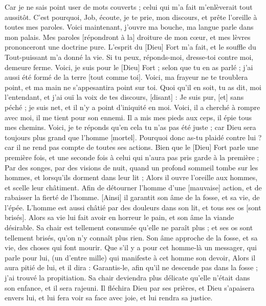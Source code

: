 \begin{multicols}{2}
Car je ne sais point user de mots couverts ; celui qui m'a fait m'enlèverait tout aussitôt.
\VerseOne{}C'est pourquoi, Job, écoute, je te prie, mon discours, et prête l'oreille à toutes mes paroles.
Voici maintenant, j'ouvre ma bouche, ma langue parle dans mon palais.
Mes paroles [répondront à la] droiture de mon cœur, et mes lèvres prononceront une doctrine pure.
L'esprit du [Dieu] Fort m'a fait, et le souffle du Tout-puissant m'a donné la vie.
Si tu peux, réponds-moi, dresse-toi contre moi, demeure ferme.
Voici, je suis pour le [Dieu] Fort ; selon que tu en as parlé ; j'ai aussi été formé de la terre [tout comme toi].
Voici, ma frayeur ne te troublera point, et ma main ne s'appesantira point sur toi.
Quoi qu'il en soit, tu as dit, moi l'entendant, et j'ai ouï la voix de tes discours, [disant] :
Je suis pur, [et] sans péché ; je suis net, et il n'y a point d'iniquité en moi.
Voici, il a cherché à rompre avec moi, il me tient pour son ennemi.
Il a mis mes pieds aux ceps, il épie tous mes chemins.
Voici, je te réponds qu'en cela tu n'as pas été juste ; car Dieu sera toujours plus grand que l'homme [mortel].
Pourquoi donc as-tu plaidé contre lui ? car il ne rend pas compte de toutes ses actions.
Bien que le [Dieu] Fort parle une première fois, et une seconde fois à celui qui n'aura pas pris garde à la première ;
Par des songes, par des visions de nuit, quand un profond sommeil tombe sur les hommes, et lorsqu'ils dorment dans leur lit ;
Alors il ouvre l'oreille aux hommes, et scelle leur châtiment.
Afin de détourner l'homme d'une [mauvaise] action, et de rabaisser la fierté de l'homme.
[Ainsi] il garantit son âme de la fosse, et sa vie, de l'épée.
L'homme est aussi châtié par des douleurs dans son lit, et tous ses os [sont brisés].
Alors sa vie lui fait avoir en horreur le pain, et son âme la viande désirable.
Sa chair est tellement consumée qu'elle ne paraît plus ; et ses os sont tellement brisés, qu'on n'y connaît plus rien.
Son âme approche de la fosse, et sa vie, des choses qui font mourir.
Que s'il y a pour cet homme-là un messager, qui parle pour lui, (un d'entre mille) qui manifeste à cet homme son devoir,
Alors il aura pitié de lui, et il dira : Garantis-le, afin qu'il ne descende pas dans la fosse ; j'ai trouvé la propitiation.
Sa chair deviendra plus délicate qu'elle n'était dans son enfance, et il sera rajeuni.
Il fléchira Dieu par ses prières, et Dieu s'apaisera envers lui, et lui fera voir sa face avec joie, et lui rendra sa justice.

\end{multicols}
